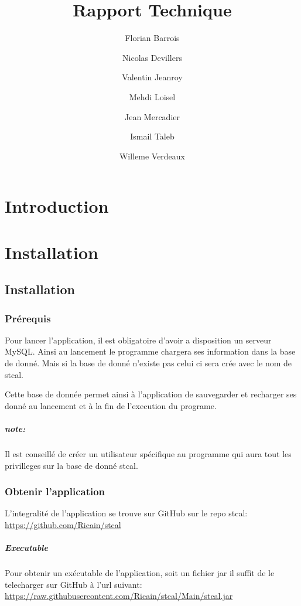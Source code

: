 \documentclass[a4paper,10pt]{report}
\title{Rapport Technique}
\author{Florian Barrois \and Nicolas Devillers \and Valentin Jeanroy \and Mehdi Loisel \and Jean Mercadier \and Ismail Taleb \and Willeme Verdeaux}
\begin{document}
\thispagestyle{headings}

\maketitle

\tableofcontents

\chapter*{Introduction}

\chapter{Installation}

	\section{Installation}

		\subsection{Prérequis}

			Pour lancer l'application, il est obligatoire d'avoir a disposition un serveur MySQL. Ainsi au lancement le programme chargera ses information dans la base de donné. Mais si la base de donné n'existe pas celui ci sera crée avec le nom de stcal.

			Cette base de donnée permet ainsi à l'application de sauvegarder et recharger ses donné au lancement et à la fin de l'execution du programe.

			\paragraph*{note:}
			Il est conseillé de créer un utilisateur spécifique au programme qui aura tout les privilleges sur la base de donné stcal.

		\subsection{Obtenir l'application}

			L'integralité de l'application se trouve sur GitHub sur le repo stcal: \href{https://github.com/Ricain/stcal}{https://github.com/Ricain/stcal}
	
			\paragraph[Binaire]{Executable}
			Pour obtenir un exécutable de l'application, soit un fichier jar il suffit de le telecharger sur GitHub à l'url suivant: \href{https://raw.githubusercontent.com/Ricain/stcal/Main/stcal.jar}{https://raw.githubusercontent.com/Ricain/stcal/Main/stcal.jar}
\end{document}
